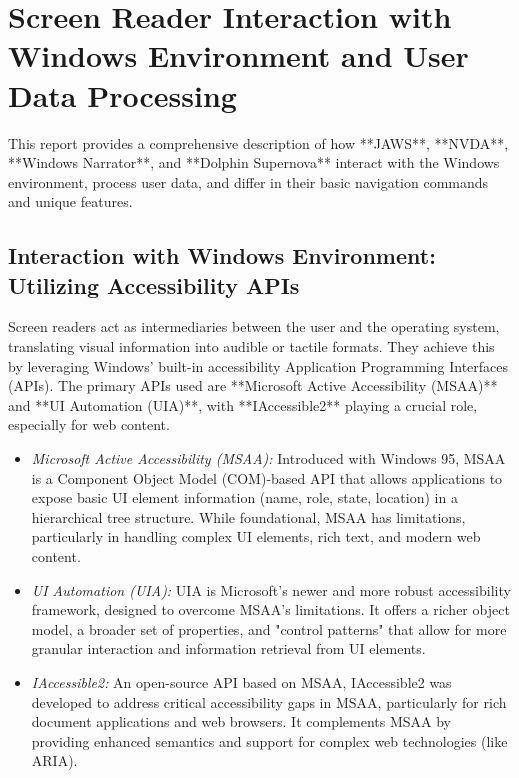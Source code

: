 \chapter{Screen Reader Interaction with Windows Environment and User Data Processing}
\label{chap:screenreader-windows}

This report provides a comprehensive description of how **JAWS**, **NVDA**, **Windows Narrator**, and **Dolphin Supernova** interact with the Windows environment, process user data, and differ in their basic navigation commands and unique features.

\section{Interaction with Windows Environment: Utilizing Accessibility APIs}
\label{sec:interaction-apis}

Screen readers act as intermediaries between the user and the operating system, translating visual information into audible or tactile formats. They achieve this by leveraging Windows' built-in accessibility Application Programming Interfaces (APIs). The primary APIs used are **Microsoft Active Accessibility (MSAA)** and **UI Automation (UIA)**, with **IAccessible2** playing a crucial role, especially for web content.

\begin{itemize}
    \item \emph{Microsoft Active Accessibility (MSAA):} Introduced with Windows 95, MSAA is a Component Object Model (COM)-based API that allows applications to expose basic UI element information (name, role, state, location) in a hierarchical tree structure. While foundational, MSAA has limitations, particularly in handling complex UI elements, rich text, and modern web content.\cite{MSAAWiki}
    \item \emph{UI Automation (UIA):} UIA is Microsoft's newer and more robust accessibility framework, designed to overcome MSAA's limitations. It offers a richer object model, a broader set of properties, and "control patterns" that allow for more granular interaction and information retrieval from UI elements.\cite{UIAutomationOverview}
    \item \emph{IAccessible2:} An open-source API based on MSAA, IAccessible2 was developed to address critical accessibility gaps in MSAA, particularly for rich document applications and web browsers. It complements MSAA by providing enhanced semantics and support for complex web technologies (like ARIA).\cite{JantridIAccessible2}
\end{itemize}

